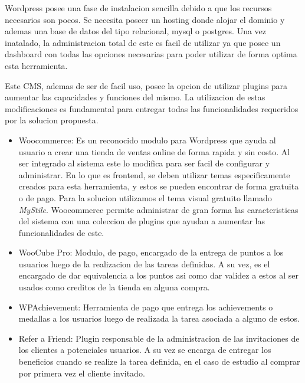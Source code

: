 Wordpress posee una fase de instalacion sencilla debido a que los recursos necesarios son pocos. Se 
necesita poseer un hosting donde alojar el dominio y ademas una base de datos del tipo relacional, mysql
o postgres. Una vez inatalado, la administracion total de este es facil de utilizar ya que posee un
dashboard con todas las opciones necesarias para poder utilizar de forma optima esta herramienta. 

Este CMS, ademas de ser de facil uso, posee la opcion de utilizar plugins para aumentar las capacidades y
funciones del mismo. La utilizacion de estas modificaciones es fundamental para entregar todas las
funcionalidades requeridos por la solucion propuesta.

\begin{itemize}

\item Woocommerce: Es un reconocido modulo para Wordpress que ayuda al usuario a crear una tienda de ventas 
online de forma rapida y sin costo. Al ser integrado al sistema este lo modifica para ser facil de configurar
y administrar. En lo que es frontend, se deben utilizar temas especificamente creados para esta herramienta, y 
estos se pueden encontrar de forma gratuita o de pago. Para la solucion utilizamos el tema visual gratuito llamado
\emph{MyStile}. Woocommerce permite administrar de gran forma las caracteristicas del sistema con una coleccion
de plugins que ayudan a aumentar las funcionalidades de este. 

\item WooCube Pro: Modulo, de pago, encargado de la entrega de puntos a los usuarios luego de la 
realizacion de las tareas definidas. A su vez, es el encargado de dar equivalencia a los puntos asi como
dar validez a estos al ser usados como creditos de la tienda en alguna compra. 

\item WPAchievement: Herramienta de pago que entrega los achievements o medallas a los usuarios
luego de realizada la tarea asociada a alguno de estos.

\item Refer a Friend: Plugin responsable de la administracion de las invitaciones de los clientes a
potenciales usuarios. A su vez se encarga de entregar los beneficios cuando se realize la tarea
definida, en el caso de estudio al comprar por primera vez el cliente invitado.

\end{itemize}
